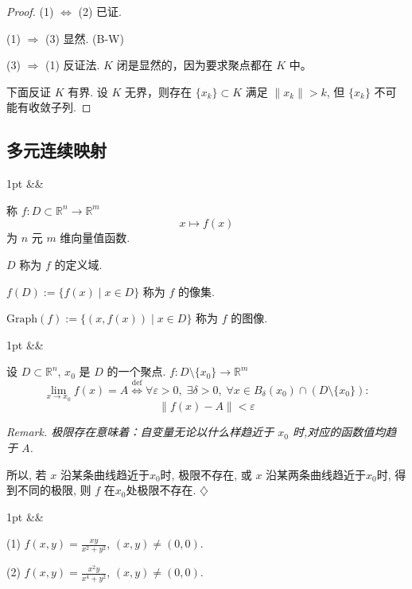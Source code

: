 \documentclass[a4paper]{article}
\newcommand{\R}{\mathbb{R}}
\newcommand{\ep}{\varepsilon}
\newenvironment{formal}[1][]{%
\def\FrameCommand{%
\hspace{1pt}%
{\color{formalline}\vrule width 2pt}%
{\color{formalshade}\vrule width 4pt}%
\colorbox{formalshade}%
}%
\MakeFramed{\advance\hsize-\width\FrameRestore}%
\noindent
\hspace{-4.55pt}%
\begin{adjustwidth}{}{1pt}%
\setlength{\parindent}{0pt}%
\vspace{3pt}%
\ifx&#1&\else %
\textbf{#1}\par
\vspace{1pt}%
\fi }{%
\vspace{2pt}%
\end{adjustwidth}\endMakeFramed%
}
\newenvironment{problem}[1][]{%
\def\FrameCommand{%
\hspace{1pt}%
{\color{problemline}\vrule width 2pt}%
{\color{problemshade}\vrule width 4pt}%
\colorbox{problemshade}%
}%
\MakeFramed{\advance\hsize-\width\FrameRestore}%
\noindent
\hspace{-4.55pt}%
\begin{adjustwidth}{}{1pt}%
\setlength{\parindent}{0pt}%
\vspace{3pt}%
\ifx&#1&\else %
\textbf{#1}\par
\vspace{1pt}%
\fi }{%
\vspace{2pt}%
\end{adjustwidth}\endMakeFramed%
}
\newenvironment{remark}{%
\par
\smallskip
\noindent
\itshape Remark. }{%
\smallskip
\hfill$\diamondsuit$ \par}
\begin{document}
    \begin{proof}[Proof]
        (1) $\Longleftrightarrow$ (2) 已证.

        (1) $\Longrightarrow$ (3) 显然. (B-W)

        (3) $\Longrightarrow$ (1) 反证法. $K$ 闭是显然的，因为要求聚点都在 $K$
        中。

        下面反证 $K$ 有界. 设 $K$ 无界，则存在 $\{x_{k}\} \subset K$ 满足
        $\|x_{k}\| > k$, 但 $\{x_{k}\}$ 不可能有收敛子列.
    \end{proof}

    \subsection{多元连续映射}

    \begin{formal}
        [多元连续映射] 称 $f: D \subset \R^{n}\longrightarrow \R^{m}$
        \[
            x \longmapsto f(x)
        \]
        为 $n$ 元 $m$ 维向量值函数.

        $D$ 称为 $f$ 的定义域.

        $f(D) := \{f(x) \mid x \in D\}$ 称为 $f$ 的像集.

        $\text{Graph}(f) := \{(x, f(x)) \mid x \in D\}$ 称为 $f$ 的图像.
    \end{formal}

    \begin{formal}
        [多元函数极限] 设 $D \subset \R^{n}$, $x_{0}$ 是 $D$ 的一个聚点. $f: D \setminus
        \{x_{0}\} \to \R^{m}$
        \[
            \lim_{x \to x_0}f(x) = A \stackrel{\text{def}}{\Longleftrightarrow}\forall
            \ep > 0, \; \exists \delta > 0, \; \forall x \in B_{\delta}(x_{0}) \cap
            (D \setminus \{x_{0}\}):
        \]
        \[
            \|f(x) - A\| < \ep
        \]
    \end{formal}

    \begin{remark}
        极限存在意味着：自变量无论以什么样趋近于 $x_{0}$ 时,对应的函数值均趋于 $A$.

        所以, 若 $x$ 沿某条曲线趋近于$x_{0}$时, 极限不存在, 或 $x$
        沿某两条曲线趋近于$x_{0}$时, 得到不同的极限, 则 $f$ 在$x_{0}$处极限不存在.
    \end{remark}

    \begin{problem}
        [E.g.] (1) $f(x, y) = \frac{xy}{x^{2}+ y^{2}}$, $(x, y) \neq (0, 0)$.

        (2) $f(x, y) = \frac{x^{2}y}{x^{4}+ y^{2}}$, $(x, y) \neq (0, 0)$.
    \end{problem}
\end{document}
